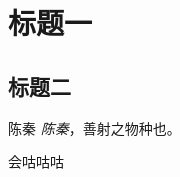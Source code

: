 \documentclass{ctexart}
\begin{document}
\section{标题一}
\subsection{标题二}

\begin{myDefination}{陈秦}
\textit{陈秦}，善射之物种也。
\begin{myProperties}
    \item 会咕咕咕
\end{myProperties}


\end{myDefination}
\end{document}
